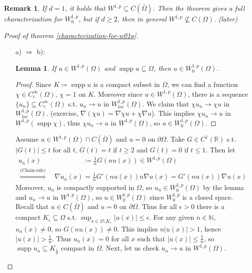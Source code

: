 \documentclass{report}
\theoremstyle{tommy}
\newtheorem{lem}[defn]{Lemma}
\newtheorem{rem}[defn]{Remark}
\newcommand{\supp}{\operatorname{supp}}
\begin{document}
  
  \begin{rem}
    If \(d = 1\), it holds that \(W^{1,p} \subseteq C(\bar \Omega)\). Then the theorem gives a full characterization for \(W_0^{1,p}\), but if \(d \ge 2\), then in general \(W^{1,p} \nsubseteq C(\Omega)\). (later)
  \end{rem}


  \begin{proof}[Proof of theorem \ref{characterization-for-w01p}]\
    \begin{itemize}
      \item [a) \(\Rightarrow\) b):]
      \begin{lem}
        If \(u \in W^{1,p}(\Omega)\) and \(\supp u \subseteq \Omega\), then \(u \in W_0^{1,p}(\Omega)\).
      \end{lem}
      \begin{proof}
        Since \(K \coloneqq \supp u\) is a compact subset in \(\Omega\), we can find a function \(\chi \in C_c^\infty(\Omega)\), \(\chi = 1\) on \(K\). Moreover since \(u \in W^{1,p}(\Omega)\), there is a sequence \(\{u_n\} \subseteq C_c^\infty(\Omega)\) s.t. \(u_n \to u\) in \(W_{loc}^{1,p}(\Omega)\). We claim that \(\chi u_n \to \chi u\) in \(W_{loc}^{1,p}(\Omega)\). (exercise, \(\nabla (\chi u) = \nabla \chi u + \chi \nabla u\)). This implies \(\chi u_n \to u\) in \(W^{1,p}(\supp \chi)\), thus \(\chi u_n \to u\) in \(W^{1,p}(\Omega)\), so \(u \in W_0^{1,p}(\Omega)\).
      \end{proof}
      Assume \(u \in W^{1,p}(\Omega) \cap C(\bar \Omega)\) and \(u = 0\) on \(\partial \Omega\). Take \(G \in C^1(\mathbb{R})\) s.t. \(|G(t)| \le t\) for all \(t\), \(G(t) = t\) if \(t \ge 2\) and \(G(t) = 0\) if \(t \le 1\). Then let
      \begin{align*}
        u_n(x) &\coloneqq \frac{1}{n} G(n u(x)) \in W^{1,p}(\Omega) \\
        \overset{\text{(Chain-rule)}}{\Rightarrow} \quad \nabla u_n(x) &= \frac{1}{n} G'(nu(x)) n \nabla u(x) = G'(n u(x)) \nabla u(x)
      \end{align*}
      Moreover, \(u_n\) is compactly supported in \(\Omega\), so \(u_n \in W_0^{1,p}(\Omega)\) by the lemma and \(u_n \to u\) in \(W^{1,p}(\Omega)\), so \(u \in W_0^{1,p}(\Omega)\) since \(W_0^{1,p}\) is a closed space. Recall that \(u \in C(\bar \Omega)\) and \(u = 0\) on \(\partial \Omega\). Thus for all \(\epsilon > 0\) there is a compact \(K_\epsilon \subseteq \Omega\) s.t. \(\sup_{x \in \Omega \setminus K_\epsilon} |u(x)| \le \epsilon\). For any given \(n \in \mathbb{N}\), \(u_n(x) \ne 0\), so \(G(nu(x)) \ne 0\). This implies \(n|u(x)| > 1\), hence \(|u(x)| > \frac{1}{n}\). Thus \(u_n(x) = 0\) for all \(x\) such that \(|u(x)| \le \frac{1}{n}\), so \(\supp u_n \subseteq K_{\frac{1}{n}}\) compact in \(\Omega\). Next, let us check \(u_n \to u\) in \(W^{1,p}(\Omega)\).

\end{itemize}
\end{proof}
\end{document}
